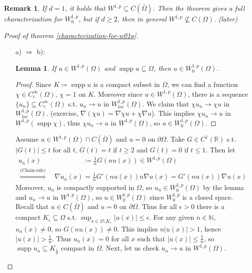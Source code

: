 \documentclass{report}
\theoremstyle{tommy}
\newtheorem{lem}[defn]{Lemma}
\newtheorem{rem}[defn]{Remark}
\newcommand{\supp}{\operatorname{supp}}
\begin{document}
  
  \begin{rem}
    If \(d = 1\), it holds that \(W^{1,p} \subseteq C(\bar \Omega)\). Then the theorem gives a full characterization for \(W_0^{1,p}\), but if \(d \ge 2\), then in general \(W^{1,p} \nsubseteq C(\Omega)\). (later)
  \end{rem}


  \begin{proof}[Proof of theorem \ref{characterization-for-w01p}]\
    \begin{itemize}
      \item [a) \(\Rightarrow\) b):]
      \begin{lem}
        If \(u \in W^{1,p}(\Omega)\) and \(\supp u \subseteq \Omega\), then \(u \in W_0^{1,p}(\Omega)\).
      \end{lem}
      \begin{proof}
        Since \(K \coloneqq \supp u\) is a compact subset in \(\Omega\), we can find a function \(\chi \in C_c^\infty(\Omega)\), \(\chi = 1\) on \(K\). Moreover since \(u \in W^{1,p}(\Omega)\), there is a sequence \(\{u_n\} \subseteq C_c^\infty(\Omega)\) s.t. \(u_n \to u\) in \(W_{loc}^{1,p}(\Omega)\). We claim that \(\chi u_n \to \chi u\) in \(W_{loc}^{1,p}(\Omega)\). (exercise, \(\nabla (\chi u) = \nabla \chi u + \chi \nabla u\)). This implies \(\chi u_n \to u\) in \(W^{1,p}(\supp \chi)\), thus \(\chi u_n \to u\) in \(W^{1,p}(\Omega)\), so \(u \in W_0^{1,p}(\Omega)\).
      \end{proof}
      Assume \(u \in W^{1,p}(\Omega) \cap C(\bar \Omega)\) and \(u = 0\) on \(\partial \Omega\). Take \(G \in C^1(\mathbb{R})\) s.t. \(|G(t)| \le t\) for all \(t\), \(G(t) = t\) if \(t \ge 2\) and \(G(t) = 0\) if \(t \le 1\). Then let
      \begin{align*}
        u_n(x) &\coloneqq \frac{1}{n} G(n u(x)) \in W^{1,p}(\Omega) \\
        \overset{\text{(Chain-rule)}}{\Rightarrow} \quad \nabla u_n(x) &= \frac{1}{n} G'(nu(x)) n \nabla u(x) = G'(n u(x)) \nabla u(x)
      \end{align*}
      Moreover, \(u_n\) is compactly supported in \(\Omega\), so \(u_n \in W_0^{1,p}(\Omega)\) by the lemma and \(u_n \to u\) in \(W^{1,p}(\Omega)\), so \(u \in W_0^{1,p}(\Omega)\) since \(W_0^{1,p}\) is a closed space. Recall that \(u \in C(\bar \Omega)\) and \(u = 0\) on \(\partial \Omega\). Thus for all \(\epsilon > 0\) there is a compact \(K_\epsilon \subseteq \Omega\) s.t. \(\sup_{x \in \Omega \setminus K_\epsilon} |u(x)| \le \epsilon\). For any given \(n \in \mathbb{N}\), \(u_n(x) \ne 0\), so \(G(nu(x)) \ne 0\). This implies \(n|u(x)| > 1\), hence \(|u(x)| > \frac{1}{n}\). Thus \(u_n(x) = 0\) for all \(x\) such that \(|u(x)| \le \frac{1}{n}\), so \(\supp u_n \subseteq K_{\frac{1}{n}}\) compact in \(\Omega\). Next, let us check \(u_n \to u\) in \(W^{1,p}(\Omega)\).

\end{itemize}
\end{proof}
\end{document}
